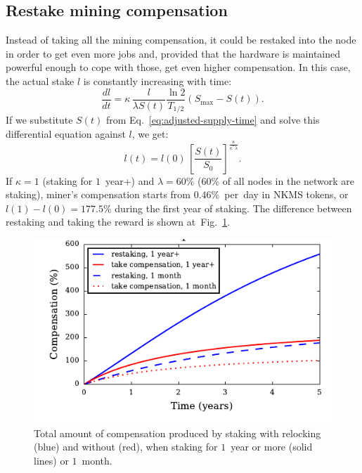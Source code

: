 \documentclass[longbibliography,nofootinbib,twocolumn]{revtex4-1}
\newcommand{\figref}[1]{Fig.~\ref{#1}}
\begin{document}
\subsection{Restake mining compensation}

Instead of taking all the mining compensation, it could be restaked into the node in order to get even more jobs and, provided that the hardware is maintained
powerful enough to cope with those, get even higher compensation.
In this case, the actual stake $l$ is constantly increasing with time:
\begin{equation}
    \frac{dl}{dt} =  \kappa\, \frac{l}{\lambda S(t)} \frac{\ln{2}}{T_{1/2}} \left( S_{\max} - S(t)\right).
\end{equation}
If we substitute $S(t)$ from Eq.~\ref{eq:adjusted-supply-time} and solve this differential equation against $l$, we get:
\begin{equation}
    l(t) = l(0)\,\left[ \frac{S(t)}{S_0} \right]^{\frac{\kappa}{\kappa^* \lambda}}.
\end{equation}
If $\kappa=1$ (staking for $1$~year+) and $\lambda=60\%$ ($60\%$ of all nodes in the network are staking),
miner's compensation starts from $0.46\%$~per~day in NKMS tokens,
or $l(1) - l(0) = 177.5\%$ during the first year of staking.
The difference between restaking and taking the reward is shown at~\figref{fig:total-compensation}.


\begin{figure}
    \includegraphics[width=\columnwidth]{pdf/total-compensation.pdf}
    \caption{Total amount of compensation produced by staking with relocking (blue) and without (red),
        when staking for $1$~year or more (solid lines) or $1$~month.}
    \label{fig:total-compensation}
\end{figure}
\end{document}

